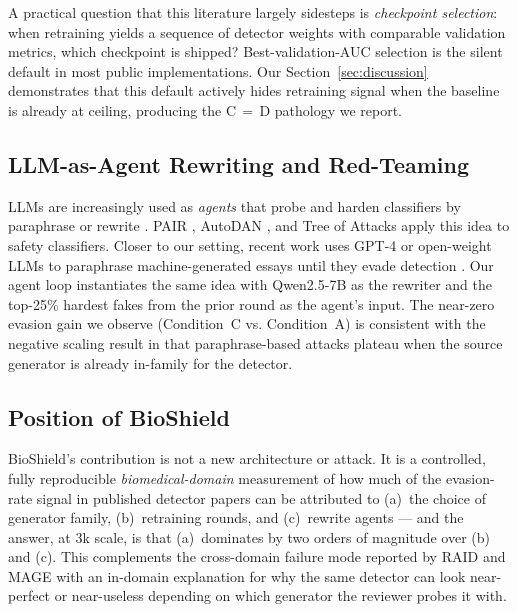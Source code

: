 \documentclass[conference]{IEEEtran}
\begin{document}
A practical question that this literature largely sidesteps is
\emph{checkpoint selection}: when retraining yields a sequence of detector
weights with comparable validation metrics, which checkpoint is shipped?
Best-validation-AUC selection is the silent default in most public
implementations. Our Section~\ref{sec:discussion} demonstrates that this
default actively hides retraining signal when the baseline is already at
ceiling, producing the C\,$=$\,D pathology we report.

\subsection{LLM-as-Agent Rewriting and Red-Teaming}
LLMs are increasingly used as \emph{agents} that probe and harden classifiers
by paraphrase or rewrite \cite{perez2022redteaming,ganguli2022redteaming}.
PAIR \cite{chao2024jailbreaking}, AutoDAN \cite{liu2023autodan}, and Tree of
Attacks \cite{mehrotra2024toa} apply this idea to safety classifiers.
Closer to our setting, recent work uses GPT-4 or open-weight LLMs to
paraphrase machine-generated essays until they evade detection
\cite{krishna2023paraphrasing,sadasivan2024aigeneratedtext}. Our agent
loop instantiates the same idea with Qwen2.5-7B as the rewriter and the
top-25\% hardest fakes from the prior round as the agent's input. The
near-zero evasion gain we observe (Condition~C vs. Condition~A) is
consistent with the negative scaling result in
\cite{sadasivan2024aigeneratedtext} that paraphrase-based attacks plateau
when the source generator is already in-family for the detector.

\subsection{Position of BioShield}
BioShield's contribution is not a new architecture or attack. It is a
controlled, fully reproducible \emph{biomedical-domain} measurement of how
much of the evasion-rate signal in published detector papers can be
attributed to (a)~the choice of generator family, (b)~retraining rounds, and
(c)~rewrite agents — and the answer, at \(3\)k scale, is that (a)~dominates
by two orders of magnitude over (b) and (c). This complements the
cross-domain failure mode reported by RAID \cite{dugan2024raid} and MAGE
\cite{li2024mage} with an in-domain explanation for why the same detector
can look near-perfect or near-useless depending on which generator the
reviewer probes it with.

\end{document}
